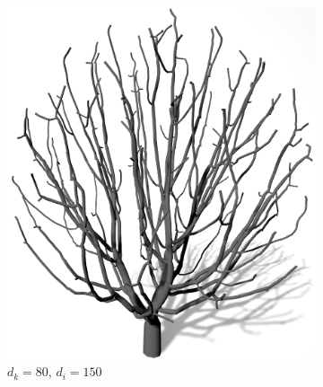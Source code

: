 \begin{figure} [hbtp]
	\centering
	\begin{subfigure}[t]{.45\textwidth}
		\centering
		\includegraphics[height=.21\textheight]{images/SCA_KDRI_LowKD_LowRI.png}
		\caption{$d_k = 80$, $d_i = 150$}
		\label{subfig:SCA_KDRI_LowKD_LowRI}
	\end{subfigure}
	\hspace{.05\linewidth}
	\begin{subfigure}[t]{.45\textwidth}
		\centering

\end{subfigure}
\end{figure}
